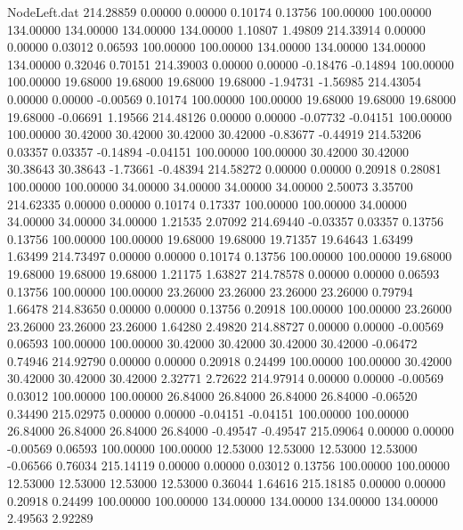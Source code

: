 \begin{filecontents}{NodeLeft.dat}
 214.28859    0.00000    0.00000     0.10174    0.13756  100.00000  100.00000  134.00000  134.00000  134.00000  134.00000    1.10807    1.49809
 214.33914    0.00000    0.00000     0.03012    0.06593  100.00000  100.00000  134.00000  134.00000  134.00000  134.00000    0.32046    0.70151
 214.39003    0.00000    0.00000    -0.18476   -0.14894  100.00000  100.00000   19.68000   19.68000   19.68000   19.68000   -1.94731   -1.56985
 214.43054    0.00000    0.00000    -0.00569    0.10174  100.00000  100.00000   19.68000   19.68000   19.68000   19.68000   -0.06691    1.19566
 214.48126    0.00000    0.00000    -0.07732   -0.04151  100.00000  100.00000   30.42000   30.42000   30.42000   30.42000   -0.83677   -0.44919
 214.53206    0.03357    0.03357    -0.14894   -0.04151  100.00000  100.00000   30.42000   30.42000   30.38643   30.38643   -1.73661   -0.48394
 214.58272    0.00000    0.00000     0.20918    0.28081  100.00000  100.00000   34.00000   34.00000   34.00000   34.00000    2.50073    3.35700
 214.62335    0.00000    0.00000     0.10174    0.17337  100.00000  100.00000   34.00000   34.00000   34.00000   34.00000    1.21535    2.07092
 214.69440   -0.03357    0.03357     0.13756    0.13756  100.00000  100.00000   19.68000   19.68000   19.71357   19.64643    1.63499    1.63499
 214.73497    0.00000    0.00000     0.10174    0.13756  100.00000  100.00000   19.68000   19.68000   19.68000   19.68000    1.21175    1.63827
 214.78578    0.00000    0.00000     0.06593    0.13756  100.00000  100.00000   23.26000   23.26000   23.26000   23.26000    0.79794    1.66478
 214.83650    0.00000    0.00000     0.13756    0.20918  100.00000  100.00000   23.26000   23.26000   23.26000   23.26000    1.64280    2.49820
 214.88727    0.00000    0.00000    -0.00569    0.06593  100.00000  100.00000   30.42000   30.42000   30.42000   30.42000   -0.06472    0.74946
 214.92790    0.00000    0.00000     0.20918    0.24499  100.00000  100.00000   30.42000   30.42000   30.42000   30.42000    2.32771    2.72622
 214.97914    0.00000    0.00000    -0.00569    0.03012  100.00000  100.00000   26.84000   26.84000   26.84000   26.84000   -0.06520    0.34490
 215.02975    0.00000    0.00000    -0.04151   -0.04151  100.00000  100.00000   26.84000   26.84000   26.84000   26.84000   -0.49547   -0.49547
 215.09064    0.00000    0.00000    -0.00569    0.06593  100.00000  100.00000   12.53000   12.53000   12.53000   12.53000   -0.06566    0.76034
 215.14119    0.00000    0.00000     0.03012    0.13756  100.00000  100.00000   12.53000   12.53000   12.53000   12.53000    0.36044    1.64616
 215.18185    0.00000    0.00000     0.20918    0.24499  100.00000  100.00000  134.00000  134.00000  134.00000  134.00000    2.49563    2.92289

\end{filecontents}
